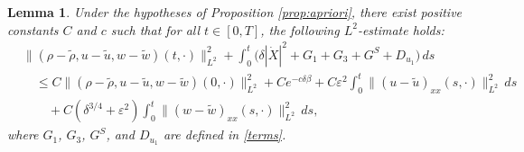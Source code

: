 \documentclass[11pt,reqno]{amsart}
\newtheorem{lemma}{Lemma}[section]
\numberwithin{equation}{section} %
\begin{document}
\begin{lemma} \label{lem:L2}
	Under the hypotheses of Proposition \ref{prop:apriori}, there exist positive constants $C$ and $c$ such that for all $t \in [0, T]$, the following $L^2$-estimate holds:
    \begin{equation} \label{est-L2}
        \begin{aligned}
    &\|(\rho - \tilde{\rho}, u - \tilde{u}, w-\tilde{w}) (t,\cdot)\|_{L^2}^2 + \int_0^t \big(\delta |\dot{X}|^2 + G_1 + G_3 + G^S + D_{u_1} \big)\,ds\\
    &\quad \leq C \|(\rho - \tilde{\rho}, u - \tilde{u}, w-\tilde{w})(0,\cdot) \|_{L^2}^2 + Ce^{-c\delta \beta}+ C\varepsilon^2 \int_0^t  \|(u-\tilde{u})_{xx}(s,\cdot)\|_{L^2}^2 \, ds\\
    &\qquad + C(\delta^{3/4}+\varepsilon^2) \int_0^t  \|(w-\tilde{w})_{xx}(s,\cdot)\|_{L^2}^2 \, ds,
\end{aligned}
\end{equation}
where $G_1$, $G_3$, $G^S$, and $D_{u_1}$ are defined in \eqref{terms}.
\end{lemma}
\end{document}
